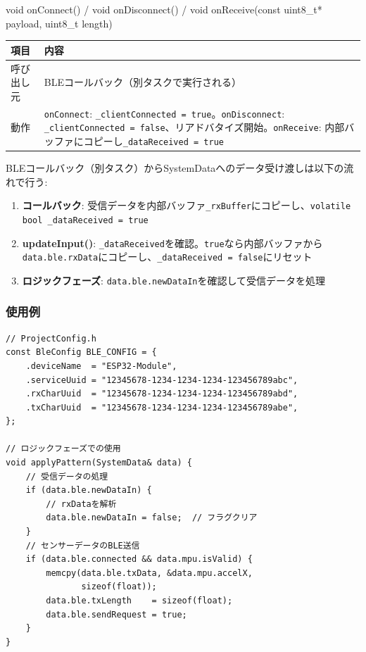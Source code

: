 \begin{funcblock}{void onConnect() / void onDisconnect() / void onReceive(const uint8\_t* payload, uint8\_t length)}
\begin{tabularx}{\textwidth}{l X}
\toprule
\textbf{項目} & \textbf{内容} \\
\midrule
呼び出し元 & BLEコールバック（別タスクで実行される） \\
動作       & \texttt{onConnect}: \texttt{\_clientConnected = true}。\texttt{onDisconnect}: \texttt{\_clientConnected = false}、リアドバタイズ開始。\texttt{onReceive}: 内部バッファにコピーし\texttt{\_dataReceived = true} \\
\bottomrule
\end{tabularx}
\end{funcblock}

\begin{notebox}[volatileフラグ方式のデータフロー]
BLEコールバック（別タスク）からSystemDataへのデータ受け渡しは以下の流れで行う:

\begin{enumerate}
    \item \textbf{コールバック}: 受信データを内部バッファ\texttt{\_rxBuffer}にコピーし、\texttt{volatile bool \_dataReceived = true}
    \item \textbf{updateInput()}: \texttt{\_dataReceived}を確認。\texttt{true}なら内部バッファから\texttt{data.ble.rxData}にコピーし、\texttt{\_dataReceived = false}にリセット
    \item \textbf{ロジックフェーズ}: \texttt{data.ble.newDataIn}を確認して受信データを処理
\end{enumerate}
\end{notebox}

\subsubsection{使用例}

\begin{lstlisting}[style=cppstyle, caption={BleModuleの使用例}]
// ProjectConfig.h
const BleConfig BLE_CONFIG = {
    .deviceName  = "ESP32-Module",
    .serviceUuid = "12345678-1234-1234-1234-123456789abc",
    .rxCharUuid  = "12345678-1234-1234-1234-123456789abd",
    .txCharUuid  = "12345678-1234-1234-1234-123456789abe",
};

// ロジックフェーズでの使用
void applyPattern(SystemData& data) {
    // 受信データの処理
    if (data.ble.newDataIn) {
        // rxDataを解析
        data.ble.newDataIn = false;  // フラグクリア
    }
    // センサーデータのBLE送信
    if (data.ble.connected && data.mpu.isValid) {
        memcpy(data.ble.txData, &data.mpu.accelX,
               sizeof(float));
        data.ble.txLength    = sizeof(float);
        data.ble.sendRequest = true;
    }
}
\end{lstlisting}
